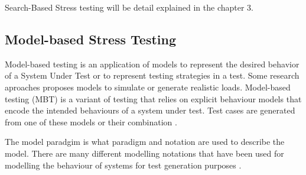 Search-Based Stress testing will be detail explained in the chapter 3.

\subsection{Model-based Stress Testing}

Model-based testing is an application  of models to represent the desired behavior of a System Under Test or to represent testing strategies in a test. Some research aproaches proposes models to simulate or  generate realistic loads. Model-based testing (MBT) is a variant of testing that relies on explicit behaviour models that encode the intended behaviours of a system under test. Test cases are generated from one of these models or their combination \cite{MarkUtting2012} \cite{Bertolino2008}. 

The model paradgim is what paradigm and notation are used to describe the model. There are many different modelling notations that have been used for modelling the behaviour of systems for test generation purposes \cite{MarkUtting2012} \cite{Hierons2009}. 

